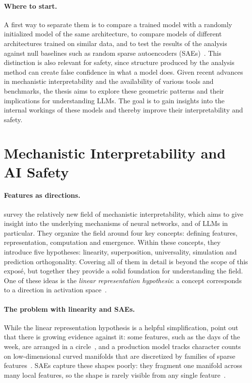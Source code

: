 \documentclass[11pt,a4paper]{article}
\newcommand{\didtodo}{\textbf{\textcolor{blue}{[DID THE TODO]}}\ }
\begin{document}
\paragraph{Where to start.}
A first way to separate them is to compare a trained model with a randomly initialized model of the same architecture, to compare models of different architectures trained on similar data, and to test the results of the analysis against null baselines such as random sparse autoencoders (SAEs)~\cite{korznikov2026sanity}.
This distinction is also relevant for safety, since structure produced by the analysis method can create false confidence in what a model does.
Given recent advances in mechanistic interpretability and the availability of various tools and benchmarks, the thesis aims to explore these geometric patterns and their implications for understanding LLMs. The goal is to gain insights into the internal workings of these models and thereby improve their interpretability and safety.

\section{Mechanistic Interpretability and AI Safety}
\paragraph{Features as directions.}
\textcite{bereska2024review} survey the relatively new field of mechanistic interpretability, which aims to give insight into the underlying mechanisms of neural networks, and of LLMs in particular.
They organize the field around four key concepts: defining features, representation, computation and emergence. Within these concepts, they introduce five hypotheses: linearity, superposition, universality, simulation and prediction orthogonality.
Covering all of them in detail is beyond the scope of this exposé, but together they provide a solid foundation for understanding the field.
One of these ideas is the \emph{linear representation
hypothesis}: a concept corresponds to a direction in activation space~\cite{park2024linear}.

\paragraph{The problem with linearity and SAEs.}
While the linear representation hypothesis is a helpful simplification, \textcite{bereska2024review} point out that there is growing evidence against it: some features, such as the days of the week, are arranged in a circle~\cite{engels2025notall,wurgaft2026manifoldsteering}, and a
production model tracks character counts on low-dimensional curved manifolds
that are discretized by families of sparse features~\cite{gurnee2025manifolds}.
SAEs capture these shapes poorly: they fragment one manifold across many
local features, so the shape is rarely visible from any
single feature~\cite{bhalla2026saemanifolds}.
\end{document}
